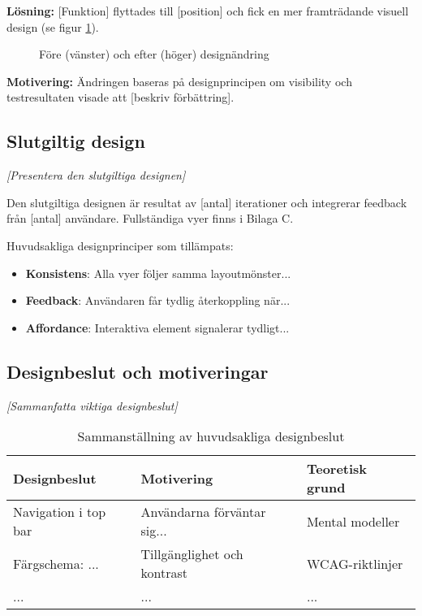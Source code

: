 \textbf{Lösning:} [Funktion] flyttades till [position] och fick en mer framträdande visuell design (se figur \ref{fig:forbattring1}).

\begin{figure}[h]
    \centering
    \caption{Före (vänster) och efter (höger) designändring}
    \label{fig:forbattring1}
\end{figure}

\textbf{Motivering:} Ändringen baseras på designprincipen om visibility \cite{sharp2019} och testresultaten visade att [beskriv förbättring].


\subsection{Slutgiltig design}

\textit{[Presentera den slutgiltiga designen]}

Den slutgiltiga designen är resultat av [antal] iterationer och integrerar feedback från [antal] användare. Fullständiga vyer finns i Bilaga C.

Huvudsakliga designprinciper som tillämpats:
\begin{itemize}
    \item \textbf{Konsistens}: Alla vyer följer samma layoutmönster...
    \item \textbf{Feedback}: Användaren får tydlig återkoppling när...
    \item \textbf{Affordance}: Interaktiva element signalerar tydligt...
\end{itemize}


\subsection{Designbeslut och motiveringar}

\textit{[Sammanfatta viktiga designbeslut]}

\begin{table}[h]
\centering
\begin{tabular}{|p{4cm}|p{5cm}|p{4cm}|}
\hline
\textbf{Designbeslut} & \textbf{Motivering} & \textbf{Teoretisk grund} \\
\hline
Navigation i top bar & Användarna förväntar sig... & Mental modeller \cite{sharp2019} \\
\hline
Färgschema: ... & Tillgänglighet och kontrast & WCAG-riktlinjer \\
\hline
... & ... & ... \\
\hline
\end{tabular}
\caption{Sammanställning av huvudsakliga designbeslut}
\end{table}
